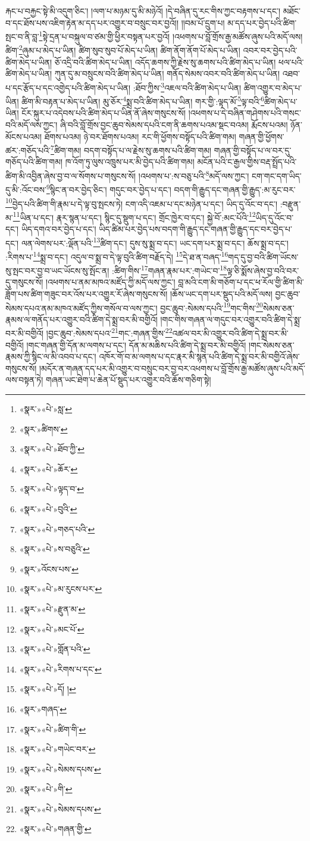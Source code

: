 རྐང་པ་བརྐྱང་སྟེ་མི་འདུག་ཅིང་། །ལག་པ་མཉམ་དུ་མི་མཉེའོ། །དེ་བཞིན་དུ་རང་གིས་ཀྱང་བརྟགས་པ་དང་། མཐོང་བ་དང་ཐོས་པས་འཇིག་རྟེན་མ་དད་པར་འགྱུར་བ་བསྲུང་བར་བྱའོ།། །།བམ་པོ་དྲུག་པ། མ་དད་པར་བྱེད་པའི་ཚིག་སྤང་བ་ནི་བླ་\footnote{«སྣར་»«པེ་»སླ་}སྟེ་དྲན་པ་བསྐུལ་བ་ཙམ་གྱི་ཕྱིར་བསྟན་པར་བྱའོ། །འཕགས་པ་བློ་གྲོས་རྒྱ་མཚོས་ཞུས་པའི་མདོ་ལས། ཚིག་\footnote{«སྣར་»ཚིགས་}ཞུམ་པ་མེད་པ་ཡིན། ཚིག་སུབ་སུབ་པོ་མེད་པ་ཡིན། ཚིག་ནོག་ནོག་པོ་མེད་པ་ཡིན། འབར་བར་བྱེད་པའི་ཚིག་མེད་པ་ཡིན། ཅོ་འདྲི་བའི་ཚིག་མེད་པ་ཡིན། འདོད་ཆགས་ཀྱི་རྗེས་སུ་ཆགས་པའི་ཚིག་མེད་པ་ཡིན། ཕལ་པའི་ཚིག་མེད་པ་ཡིན། ཀུན་དུ་མ་བསྲུངས་བའི་ཚིག་མེད་པ་ཡིན། གནོད་སེམས་འབར་བའི་ཚིག་མེད་པ་ཡིན། འཐབ་པ་དང་རྩོད་པ་དང་འགྱེད་པའི་ཚིག་མེད་པ་ཡིན། :ཐོབ་ཀྱིས་\footnote{«སྣར་»«པེ་»ཐོབ་ཀྱི་}འཇལ་བའི་ཚིག་མེད་པ་ཡིན། ཚིག་འགྱུར་བ་མེད་པ་ཡིན། ཚིག་མི་བརྟན་པ་མེད་པ་ཡིན། མུ་ཅོར་\footnote{«སྣར་»«པེ་»ཆོར་}སྨྲ་བའི་ཚིག་མེད་པ་ཡིན། གར་གྱི་:ལྟད་མོ་\footnote{«སྣར་»«པེ་»ལྟད་བ་}ལྟ་བའི་\footnote{«སྣར་»«པེ་»བུའི་}ཚིག་མེད་པ་ཡིན། ངོར་སྐུར་པ་འདེབས་པའི་ཚིག་མེད་པ་ཡིན་ནོ་ཞེས་གསུངས་སོ། །འཕགས་པ་དེ་བཞིན་གཤེགས་པའི་གསང་བའི་མདོ་ལས་ཀྱང་། ཞི་བའི་བློ་གྲོས་བྱང་ཆུབ་སེམས་དཔའི་ངག་ནི་ཆགས་པའམ་སྡང་བའམ། རྨོངས་པའམ། ཉོན་མོངས་པའམ། ཐོགས་པའམ། ཉེ་བར་ཐོགས་པའམ། རང་གི་ཕྱོགས་བསྟོད་པའི་ཚིག་གམ། གཞན་གྱི་ཕྱོགས་ཚར་:གཅོད་པའི་\footnote{«སྣར་»«པེ་»གཅད་པའི་}ཚིག་གམ། བདག་བསྟོད་པ་ལ་རྗེས་སུ་ཆགས་པའི་ཚིག་གམ། གཞན་གྱི་བསྟོད་པ་ལ་བར་དུ་གཅོད་པའི་ཚིག་གམ། ཁ་འོག་ཏུ་ལུས་འཁྲུས་པར་མི་བྱེད་པའི་ཚིག་གམ། མངོན་པའི་ང་རྒྱལ་གྱིས་བརྡ་སྤྲོད་པའི་ཚིག་མི་འབྱིན་ཞེས་བྱ་བ་ལ་སོགས་པ་གསུངས་སོ། །འཕགས་པ་:ས་བཅུ་པའི་\footnote{«སྣར་»«པེ་»ས་བཅུའི་}མདོ་ལས་ཀྱང་། ངག་གང་དག་ཡིད་དུ་མི་:འོང་བས་\footnote{«སྣར་»འོངས་པས་}སྙིང་ན་བར་བྱེད་ཅིང་། གདུང་བར་བྱེད་པ་དང་། བདག་གི་རྒྱུད་དང་གཞན་གྱི་རྒྱུད་:མ་རུང་བར་\footnote{«སྣར་»«པེ་»མ་རུངས་པར་}བྱེད་པའི་ཚིག་གི་རྣམ་པ་དེ་ལྟ་བུ་སྤངས་ཏེ། ངག་འདི་འཇམ་པ་དང་མཉེན་པ་དང་། ཡིད་དུ་འོང་བ་དང་། :བརྫུན་མ་\footnote{«སྣར་»«པེ་»རྫུན་མ་}ཡིན་པ་དང་། རྣར་སྙན་པ་དང་། སྙིང་དུ་སྡུག་པ་དང་། གྲོང་ཁྱེར་བ་དང་། སྐྱེ་བོ་:མང་པོའི་\footnote{«སྣར་»«པེ་»མང་པོ་}ཡིད་དུ་འོང་བ་དང་། ཡིད་དགའ་བར་བྱེད་པ་དང་། ཡིད་ཚིམ་པར་བྱེད་པས་བདག་གི་རྒྱུད་དང་གཞན་གྱི་རྒྱུད་དང་བར་བྱེད་པ་དང་། ལན་ལེགས་པར་:ལྡོན་པའི་\footnote{«སྣར་»«པེ་»གློན་པའི་}ཚིག་དང་། དུས་སུ་སྨྲ་བ་དང་། ཡང་དག་པར་སྨྲ་བ་དང་། ཆོས་སྨྲ་བ་དང་། :རིགས་པ་\footnote{«སྣར་»«པེ་»རིགས་པ་དང་}སྨྲ་བ་དང་། འདུལ་བ་སྨྲ་བ་དེ་ལྟ་བུའི་ཚིག་བརྗོད་དེ། \footnote{«སྣར་»«པེ་»དོ། ། }དེ་ཐ་ན་བཞད་\footnote{«སྣར་»གཞད་}གད་དུ་བྱ་བའི་ཚིག་ཡོངས་སུ་སྤང་བར་བྱ་བ་ཡང་ཡོངས་སུ་སྤོང་ན། :ཚིག་གིས་\footnote{«སྣར་»«པེ་»ཚིག་གི་}གཞན་རྣམ་པར་:གཡེང་བ་\footnote{«སྣར་»«པེ་»གཡེང་བར་}ལྟ་ཅི་སྨོས་ཞེས་བྱ་བའི་བར་དུ་གསུངས་སོ། །འཕགས་པ་ནམ་མཁའ་མཛོད་ཀྱི་མདོ་ལས་ཀྱང་། བླ་མའི་ངག་མི་གཅོག་པ་དང་ཕ་རོལ་གྱི་ཚིག་མི་ཟློག་པས་ཚིག་གཟུང་བར་འོས་པར་འགྱུར་རོ་ཞེས་གསུངས་སོ། །ཆོས་ཡང་དག་པར་སྡུད་པའི་མདོ་ལས། བྱང་ཆུབ་སེམས་དཔའ་ནམ་མཁའ་མཛོད་ཀྱིས་གསོལ་བ་ལས་ཀྱང་། བྱང་ཆུབ་:སེམས་དཔའི་\footnote{«སྣར་»«པེ་»སེམས་དཔས་}གང་གིས་\footnote{«སྣར་»«པེ་»གི་}སེམས་ཅན་རྣམས་ལ་གནོད་པར་འགྱུར་བའི་ཚིག་དེ་སྨྲ་བར་མི་བགྱིའོ། །གང་གིས་གཞན་ལ་གདུང་བར་འགྱུར་བའི་ཚིག་དེ་སྨྲ་བར་མི་བགྱིའོ། །བྱང་ཆུབ་:སེམས་དཔའ་\footnote{«སྣར་»«པེ་»སེམས་དཔས་}གང་:གཞན་གྱིས་\footnote{«སྣར་»«པེ་»གཞན་གྱི་}འཚལ་བར་མི་འགྱུར་བའི་ཚིག་དེ་སྨྲ་བར་མི་བགྱིའོ། །གང་གཞན་གྱི་དོན་མ་ལགས་པ་དང་། དོན་མ་མཆིས་པའི་ཚིག་དེ་སྨྲ་བར་མི་བགྱིའོ། །གང་སེམས་ཅན་རྣམས་ཀྱི་སྙིང་ལ་མི་འབབ་པ་དང་། འཁོར་གོ་བ་མ་ལགས་པ་དང་རྣར་མི་སྙན་པའི་ཚིག་དེ་སྨྲ་བར་མི་བགྱིའོ་ཞེས་གསུངས་སོ། །མདོར་ན་གཞན་དད་པར་མི་འགྱུར་བ་བསྲུང་བར་བྱ་བར་འཕགས་པ་བློ་གྲོས་རྒྱ་མཚོས་ཞུས་པའི་མདོ་ལས་བསྟན་ཏེ། གཞན་ཡང་ཐེག་པ་ཆེན་པོ་སྡུད་པར་འགྱུར་བའི་ཆོས་གཅིག་སྟེ། 